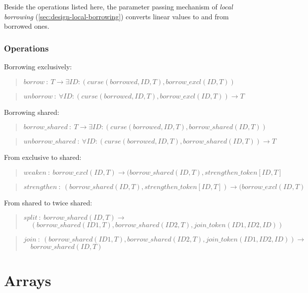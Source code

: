 \documentclass[a4paper]{book}
\newcommand\FuncSignature[2]{\begin{quote}$\mathit{#1}\ :\ \mathit{#2}$\end{quote}}
\newcommand\FuncSignatureII[3]{\begin{quote}$\mathit{#1}\ :\ \mathit{#2} \to$\\${}\quad \mathit{#3}$ \end{quote}}
\begin{document}
Beside the operations listed here, the parameter passing mechanism of
\emph{local borrowing} (\ref{sec:design-local-borrowing})
converts linear values to and from borrowed ones.

\subsection*{Operations}
Borrowing exclusively:

\FuncSignature{borrow}{T \to \exists ID: (curse(borrowed, ID, T), borrow\_excl(ID, T))}
\FuncSignature{unborrow}{\forall ID: (curse(borrowed, ID, T), borrow\_excl(ID, T)) \to T}

\noindent
Borrowing shared:

\FuncSignature{borrow\_shared}{T \to \exists ID: (curse(borrowed, ID, T), borrow\_shared(ID, T))}
\FuncSignature{unborrow\_shared}{\forall ID: (curse(borrowed, ID, T), borrow\_shared(ID, T)) \to T}

\noindent
From exclusive to shared:

\FuncSignature{weaken}{borrow\_excl(ID, T) \to (borrow\_shared(ID, T), strengthen\_token[ID,T]}
\FuncSignature{strengthen}{(borrow\_shared(ID, T), strengthen\_token[ID,T]) \to (borrow\_excl(ID, T)}

\noindent
From shared to twice shared:

\FuncSignatureII{split}
{borrow\_shared(ID, T)}
{(borrow\_shared(ID1, T), borrow\_shared(ID2, T), join\_token(ID1,ID2,ID))}

\FuncSignatureII{join}
{(borrow\_shared(ID1, T), borrow\_shared(ID2, T), join\_token(ID1,ID2,ID))}
{borrow\_shared(ID, T)}





\chapter{Arrays}
\end{document}
